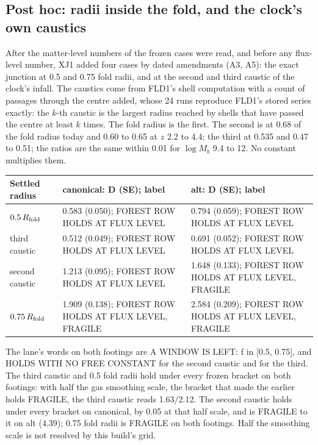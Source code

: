\documentclass[10pt]{article}
\begin{document}
\subsection{Post hoc: radii inside the fold, and the clock's own caustics}
After the matter-level numbers of the frozen cases were read, and before any flux-level number, XJ1 added four cases by dated amendments (A3, A5): the exact junction at 0.5 and 0.75 fold radii, and at the second and third caustic of the clock's infall. The caustics come from FLD1's shell computation with a count of passages through the centre added, whose 24 runs reproduce FLD1's stored series exactly: the $k$-th caustic is the largest radius reached by shells that have passed the centre at least $k$ times. The fold radius is the first. The second is at 0.68 of the fold radius today and 0.60 to 0.65 at $z$ 2.2 to 4.4; the third at 0.535 and 0.47 to 0.51; the ratios are the same within 0.01 for $\log M_b$ 9.4 to 12. No constant multiplies them.
{\small
\begin{longtable}{@{}p{3.4cm}p{6.0cm}p{6.0cm}@{}}\toprule
Settled radius & canonical: D (SE); label & alt: D (SE); label\\\midrule\endhead
$0.5\,R_{\rm fold}$ & 0.583 (0.050); FOREST ROW HOLDS AT FLUX LEVEL & 0.794 (0.059); FOREST ROW HOLDS AT FLUX LEVEL\\
third caustic & 0.512 (0.049); FOREST ROW HOLDS AT FLUX LEVEL & 0.691 (0.052); FOREST ROW HOLDS AT FLUX LEVEL\\
second caustic & 1.213 (0.095); FOREST ROW HOLDS AT FLUX LEVEL & 1.648 (0.133); FOREST ROW HOLDS AT FLUX LEVEL, FRAGILE\\
$0.75\,R_{\rm fold}$ & 1.909 (0.138); FOREST ROW HOLDS AT FLUX LEVEL, FRAGILE & 2.584 (0.209); FOREST ROW HOLDS AT FLUX LEVEL, FRAGILE\\\bottomrule
\end{longtable}}
The lane's words on both footings are A WINDOW IS LEFT: f in [0.5, 0.75], and HOLDS WITH NO FREE CONSTANT for the second caustic and for the third. The third caustic and 0.5 fold radii hold under every frozen bracket on both footings: with half the gas smoothing scale, the bracket that made the earlier holds FRAGILE, the third caustic reads 1.63/2.12. The second caustic holds under every bracket on canonical, by 0.05 at that half scale, and is FRAGILE to it on alt (4.39); 0.75 fold radii is FRAGILE on both footings. Half the smoothing scale is not resolved by this build's grid.
\end{document}
